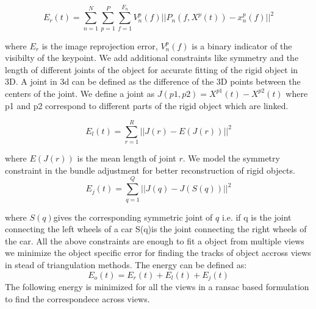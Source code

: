 \documentclass[10pt,twocolumn,letterpaper]{article}
\begin{document}
\begin{equation}
  	E_r(t) =\sum_{n=1}^{N} \sum_{p=1}^P \sum_{f=1}^{F_n} V_n^p(f) ||P_n(f,X^p(t)) - x_n^p(f)||^2
\end{equation}
   
where $E_r$ is the image reprojection error, $V_n^p(f)$ is a binary indicator of the visibilty of the keypoint. We add additional constraints like symmetry and the length of different joints of the object for accurate fitting of the rigid object in 3D. A joint in 3d can be defined as the difference of the 3D points between the centers of the joint. We define a joint as $J(p1,p2) = X^{p1}(t) - X^{p2}(t) $ where p1 and p2 correspond to different parts of the rigid object which are linked. 

\begin{equation}
  	E_l(t) = \sum_{r=1}^R ||J(r) - E(J(r))||^2  
\end{equation}

where $E(J(r))$ is the mean length of joint $r$. We model the symmetry constraint in the bundle adjustment for better reconstruction of rigid objects.
\begin{equation}
  	E_j(t) = \sum_{q = 1}^Q ||J(q) - J(S(q))||^2
\end{equation}

where $S(q)$gives the corresponding symmetric joint of $q$ i.e. if q is the joint connecting the left wheels of a car S(q)is the joint connecting the right wheels of the car. All the above constraints are enough to fit a object from multiple views we minimize the object specific error for finding the tracks of object accross views in stead of triangulation methods.  The energy can be defined as:
\begin{equation}
  	E_o(t) = E_r(t) +  E_l(t) + E_j(t)
  	\label{eq:corr_accross_views}
\end{equation}
The following energy is minimized for all the views in a ransac based formulation to find the correspondece across views.
\end{document}
